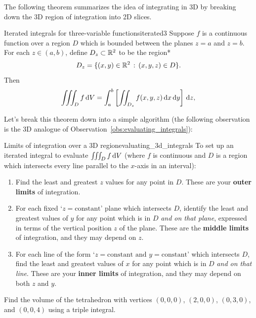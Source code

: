 \documentclass{watsonbook}
\begin{document}
The following theorem summarizes the idea of integrating in 3D by
breaking down the 3D region of integration into 2D slices.

\begin{theo}{Iterated integrals for three-variable functions}{iterated3}
  Suppose $f$ is a continuous function over a region $D$ which is
  bounded between the planes $z = a$ and $z = b$. For each
  $z \in (a,b)$, define $D_z \subset \mathbb{R}^2$ to be the region*
  \[
    D_z = \{(x,y) \in \mathbb{R}^2 \, : \, (x,y,z) \in D\}. 
  \]
  Then
  \[
    \iiint _D f \, {\mathrm{d}}V =
    \int_a^b \left[\iint_{D_z} f(x,y,z) \, \mathrm{d} x \, \mathrm{d} y \right] \, {\mathrm{d}}z, 
  \]
\end{theo}

Let's break this theorem down into a simple algorithm (the following
observation is the 3D analogue of
Observation~\ref{obs:evaluating_integrals}):

\begin{obs}{Limits of integration over a 3D
    region}{evaluating_3d_integrals}
  To set up an iterated integral to evaluate $\iiint_D f \, {\mathrm{d}}V$
  (where $f$ is continuous and $D$ is a region which intersects every
  line parallel to the $x$-axis in an interval): 
  \begin{enumerate}[itemsep=3pt, topsep = 8pt, leftmargin = 12pt]
  \item Find the least and greatest $z$ values for any point in
    $D$. These are your \textbf{outer limits} of integration. 
  \item For each fixed `$z=\text{constant}$' plane which intersects $D$, identify
    the least and greatest values of $y$ for any point which is in $D$
    \textit{and on that plane}, expressed in terms of the vertical
    position $z$ of the plane. These are the \textbf{middle limits} of
    integration, and they may depend on $z$.
  \item For each line of the form
    `$z=\text{constant and }y=\text{constant}$' which intersects $D$,
    find the least and greatest values of $x$ for any point which is
    in $D$ \textit{and on that line}. These are your \textbf{inner
      limits} of integration, and they may depend on both $z$ and $y$.
  \end{enumerate}
\end{obs}

\begin{example}{}{}
  Find the volume of the tetrahedron with vertices $(0,0,0)$,
  $(2,0,0)$, $(0,3,0)$, and $(0,0,4)$ using a triple integral.
\end{example}
\end{document}
